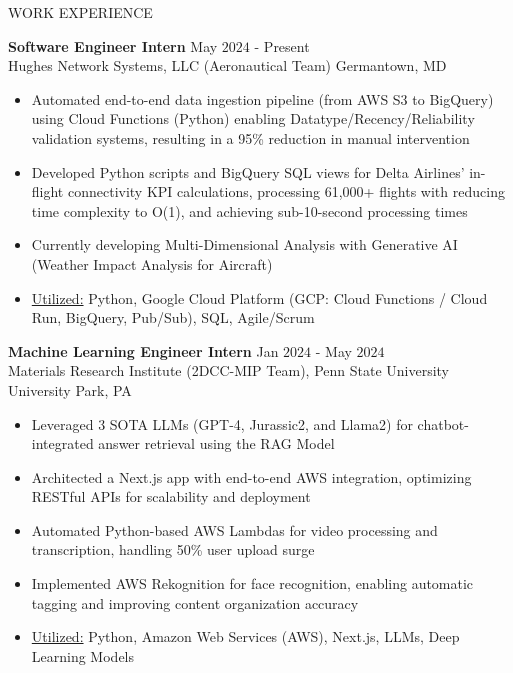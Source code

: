 \documentclass{resume} %
\begin{document}
\begin{rSection}{WORK EXPERIENCE}

{\bf Software Engineer Intern} \hfill May $2024$ - Present\\
Hughes Network Systems, LLC (Aeronautical Team) \hfill Germantown, MD
\begin{itemize}[itemsep = -4pt]
    \item Automated end-to-end data ingestion pipeline (from AWS S3 to BigQuery) using Cloud Functions (Python) enabling Datatype/Recency/Reliability validation systems, resulting in a 95\% reduction in manual intervention
    \item Developed Python scripts and BigQuery SQL views for Delta Airlines' in-flight connectivity KPI calculations, processing 61,000+ flights with reducing time complexity to O(1), and achieving sub-10-second processing times
    \item Currently developing Multi-Dimensional Analysis with Generative AI (Weather Impact Analysis for Aircraft)
    \item \underline{Utilized:} Python, Google Cloud Platform (GCP: Cloud Functions / Cloud Run, BigQuery, Pub/Sub), SQL, Agile/Scrum
\end{itemize}

{\bf Machine Learning Engineer Intern} \hfill Jan $2024$ - May $2024$\\
Materials Research Institute (2DCC-MIP Team), Penn State University \hfill University Park, PA
\begin{itemize}[itemsep = -4pt]
    \item Leveraged 3 SOTA LLMs (GPT-4, Jurassic2, and Llama2) for chatbot-integrated answer retrieval using the RAG Model
    \item Architected a Next.js app with end-to-end AWS integration, optimizing RESTful APIs for scalability and deployment
    \item Automated Python-based AWS Lambdas for video processing and transcription, handling 50\% user upload surge
    \item Implemented AWS Rekognition for face recognition, enabling automatic tagging and improving content organization accuracy
    \item \underline{Utilized:} Python, Amazon Web Services (AWS), Next.js, LLMs, Deep Learning Models 
\end{itemize}


\end{rSection}
\end{document}
